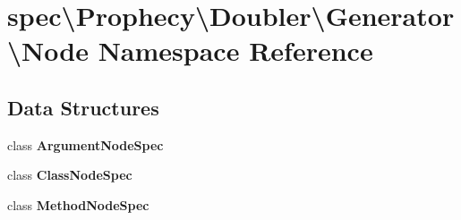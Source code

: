\section{spec\textbackslash{}Prophecy\textbackslash{}Doubler\textbackslash{}Generator\textbackslash{}Node Namespace Reference}
\label{namespacespec_1_1_prophecy_1_1_doubler_1_1_generator_1_1_node}
\subsection*{Data Structures}
\begin{DoxyCompactItemize}
\item 
class {\bf Argument\+Node\+Spec}
\item 
class {\bf Class\+Node\+Spec}
\item 
class {\bf Method\+Node\+Spec}
\end{DoxyCompactItemize}
